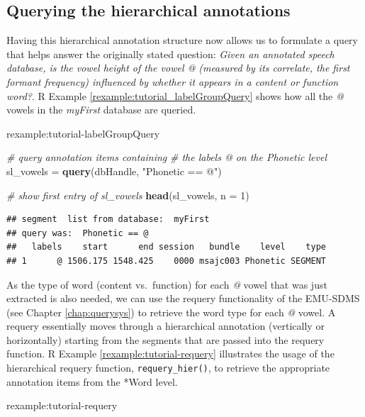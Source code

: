 \documentclass[]{book}
\newenvironment{Shaded}{\begin{snugshade}}{\end{snugshade}}
\newcommand{\CommentTok}[1]{\textcolor[rgb]{0.56,0.35,0.01}{\textit{#1}}}
\newcommand{\DataTypeTok}[1]{\textcolor[rgb]{0.13,0.29,0.53}{#1}}
\newcommand{\DecValTok}[1]{\textcolor[rgb]{0.00,0.00,0.81}{#1}}
\newcommand{\KeywordTok}[1]{\textcolor[rgb]{0.13,0.29,0.53}{\textbf{#1}}}
\newcommand{\NormalTok}[1]{#1}
\newcommand{\StringTok}[1]{\textcolor[rgb]{0.31,0.60,0.02}{#1}}
\theoremstyle{definition}
\theoremstyle{definition}
\theoremstyle{definition}
\theoremstyle{remark}
\begin{document}
\hypertarget{querying-the-hierarchical-annotations}{%
\subsection{Querying the hierarchical
annotations}\label{querying-the-hierarchical-annotations}}

Having this hierarchical annotation structure now allows us to formulate
a query that helps answer the originally stated question: \emph{Given an
annotated speech database, is the vowel height of the vowel @ (measured
by its correlate, the first formant frequency) influenced by whether it
appears in a content or function word?}. R Example
\ref{rexample:tutorial_labelGroupQuery} shows how all the \emph{@}
vowels in the \emph{myFirst} database are queried.

rexample:tutorial-labelGroupQuery

\begin{Shaded}
\begin{Highlighting}[]
\CommentTok{# query annotation items containing}
\CommentTok{# the labels @ on the Phonetic level}
\NormalTok{sl_vowels =}\StringTok{ }\KeywordTok{query}\NormalTok{(dbHandle, }\StringTok{"Phonetic == @"}\NormalTok{)}

\CommentTok{# show first entry of sl_vowels}
\KeywordTok{head}\NormalTok{(sl_vowels, }\DataTypeTok{n =} \DecValTok{1}\NormalTok{)}
\end{Highlighting}
\end{Shaded}

\begin{verbatim}
## segment  list from database:  myFirst 
## query was:  Phonetic == @ 
##   labels    start      end session   bundle    level    type
## 1      @ 1506.175 1548.425    0000 msajc003 Phonetic SEGMENT
\end{verbatim}

As the type of word (content vs.~function) for each \emph{@} vowel that
was just extracted is also needed, we can use the requery functionality
of the EMU-SDMS (see Chapter \ref{chap:querysys}) to retrieve the word
type for each \emph{@} vowel. A requery essentially moves through a
hierarchical annotation (vertically or horizontally) starting from the
segments that are passed into the requery function. R Example
\ref{rexample:tutorial-requery} illustrates the usage of the
hierarchical requery function, \texttt{requery\_hier()}, to retrieve the
appropriate annotation items from the *Word level.

rexample:tutorial-requery
\end{document}
